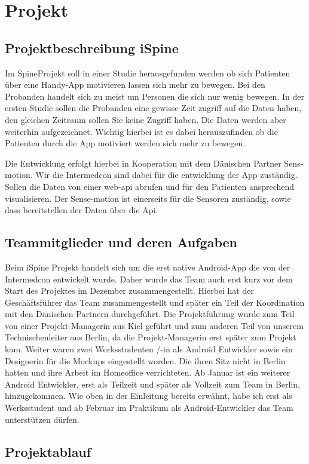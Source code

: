 \chapter{Projekt}
\section{Projektbeschreibung iSpine}
Im \glqq Spine\grqq Projekt soll in einer Studie herausgefunden werden ob sich Patienten über eine Handy-App motivieren lassen sich mehr zu bewegen.
Bei den Probanden handelt sich zu meist um Personen die sich nur wenig bewegen. In der ersten Studie sollen die Probanden eine gewisse Zeit zugriff auf die Daten haben, den gleichen Zeitraum sollen Sie keine Zugriff haben. Die Daten werden aber weiterhin aufgezeichnet. Wichtig hierbei ist es dabei herauszufinden ob die Patienten durch die App motiviert werden sich mehr zu bewegen.

Die Entwicklung erfolgt hierbei in Kooperation mit dem Dänischen Partner \glqq Sens-motion\grqq. Wir die Intermedcon sind dabei für die entwicklung der App zuständig. Sollen die Daten von einer web-api abrufen und für den Patienten ansprechend visualisieren. Der Sense-motion ist einerseits für die Sensoren zuständig, sowie dass bereitstellen der Daten über die Api.
\section{Teammitglieder und deren Aufgaben}
Beim iSpine Projekt handelt sich um die erst native Android-App die von der Intermedcon entwickelt wurde. Daher wurde das Team auch erst kurz vor dem Start des Projektes im Dezember zusammengestellt. Hierbei hat der Geschäftsführer das Team zusammengestellt und später ein Teil der Koordination mit den Dänischen Partnern durchgeführt. Die Projektführung wurde zum Teil von einer Projekt-Managerin aus Kiel geführt und zum anderen Teil von unserem Technischenleiter aus Berlin, da  die Projekt-Managerin erst später zum Projekt kam. Weiter waren  zwei Werksstudenten /-in als Android Entwickler sowie ein Designerin für die Mockups eingestellt worden. Die ihren Sitz nicht in Berlin hatten und ihre Arbeit im Homeoffice verrichteten. Ab Januar ist ein weiterer Android Entwickler, erst als Teilzeit und später als Vollzeit zum Team in Berlin, hinzugekommen. Wie oben in der Einleitung bereits erwähnt, habe ich erst als Werksstudent und ab Februar im Praktikum als Android-Entwickler das Team unterstützen dürfen.
\section{Projektablauf}
